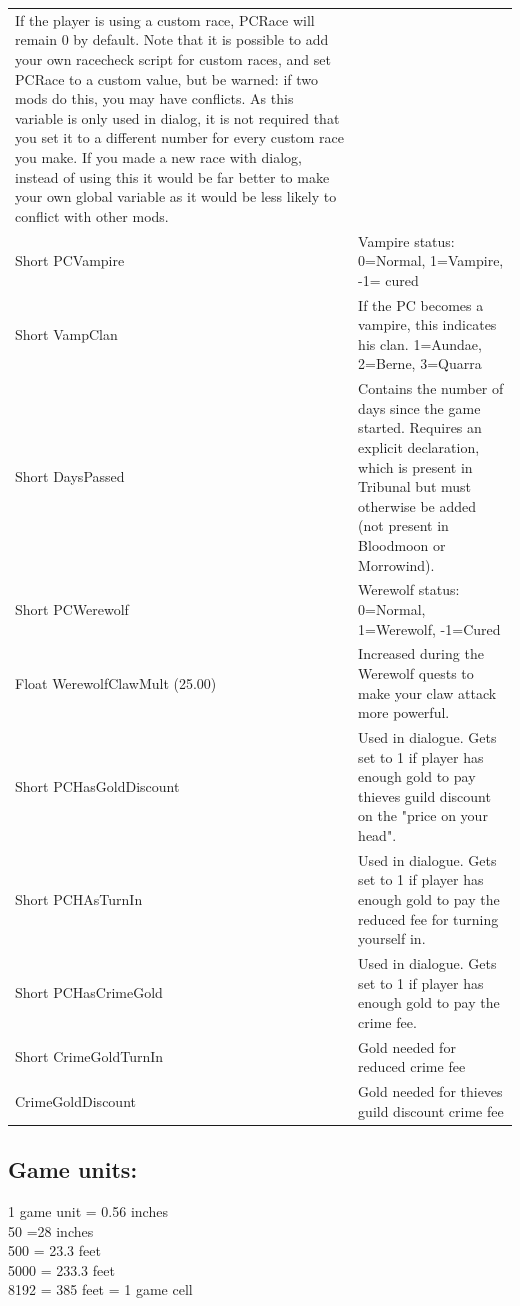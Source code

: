 \begin{longtable}[]{@{}
  >{\raggedright\arraybackslash}p{}
  >{\raggedright\arraybackslash}p{}@{}}
If the player is using a custom race, PCRace will remain 0 by default.
Note that it is possible to add your own racecheck script for custom
races, and set PCRace to a custom value, but be warned: if two mods do
this, you may have conflicts. As this variable is only used in dialog,
it is not required that you set it to a different number for every
custom race you make. If you made a new race with dialog, instead of
using this it would be far better to make your own global variable as it
would be less likely to conflict with other mods. \\
Short PCVampire & Vampire status: 0=Normal, 1=Vampire, -1= cured \\
Short VampClan & If the PC becomes a vampire, this indicates his clan.
1=Aundae, 2=Berne, 3=Quarra \\
Short DaysPassed & Contains the number of days since the game started.
Requires an explicit declaration, which is present in Tribunal but must
otherwise be added (not present in Bloodmoon or Morrowind). \\
Short PCWerewolf & Werewolf status: 0=Normal, 1=Werewolf, -1=Cured \\
Float WerewolfClawMult (25.00) & Increased during the Werewolf quests to
make your claw attack more powerful. \\
Short PCHasGoldDiscount & Used in dialogue. Gets set to 1 if player has
enough gold to pay thieves guild discount on the "price on your
head". \\
Short PCHAsTurnIn & Used in dialogue. Gets set to 1 if player has enough
gold to pay the reduced fee for turning yourself in. \\
Short PCHasCrimeGold & Used in dialogue. Gets set to 1 if player has
enough gold to pay the crime fee. \\
Short CrimeGoldTurnIn & Gold needed for reduced crime fee \\
CrimeGoldDiscount & Gold needed for thieves guild discount crime fee \\
\bottomrule
\end{longtable}

\hypertarget{game-units}{%
\subsection{\texorpdfstring{\hfill\break
Game units:}{ Game units:}}\label{game-units}}

1 game unit = 0.56 inches\\
50 =28 inches\\
500 = 23.3 feet\\
5000 = 233.3 feet\\
8192 = 385 feet = 1 game cell

